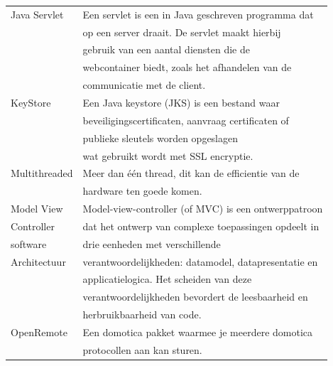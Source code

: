 \documentclass[]{article}
\begin{document}
\begin{tabular}{|| l | l ||}
    Java Servlet     & Een servlet is een in Java geschreven programma dat  \\
                     & op een server draait. De servlet maakt hierbij       \\
                     & gebruik van een aantal diensten die de               \\
                     & webcontainer biedt, zoals het afhandelen van de      \\
                     & communicatie met de client.                          \\\hline
    KeyStore         & Een Java keystore (JKS) is een bestand waar          \\
                     & beveiligingscertificaten, aanvraag certificaten of   \\
                     & publieke sleutels worden opgeslagen                  \\
                     & wat gebruikt wordt met SSL encryptie.                \\\hline
    Multithreaded    & Meer dan \'e\'en thread, dit kan de efficientie van de   \\
                     & hardware ten goede komen.                            \\\hline
    Model View       & Model-view-controller (of MVC) is een ontwerppatroon \\
    Controller       & dat het ontwerp van complexe toepassingen opdeelt in \\
    software         & drie eenheden met verschillende                      \\
    Architectuur     & verantwoordelijkheden: datamodel, datapresentatie en \\
                     & applicatielogica. Het scheiden van deze              \\
                     & verantwoordelijkheden bevordert de leesbaarheid en   \\
                     & herbruikbaarheid van code.                           \\\hline
    OpenRemote       & Een domotica pakket waarmee je meerdere domotica     \\
                     & protocollen aan kan sturen.                          \\\hline
\end{tabular}
\newpage
\end{document}
